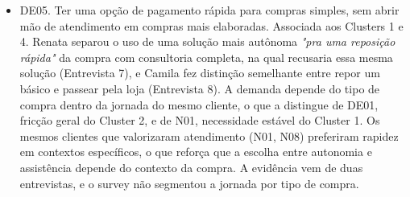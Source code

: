 \begin{itemize}
    \item DE05. Ter uma opção de pagamento rápida para compras simples, sem abrir mão de atendimento em compras mais elaboradas. Associada aos Clusters 1 e 4. Renata separou o uso de uma solução mais autônoma \emph{"pra uma reposição rápida"} da compra com consultoria completa, na qual recusaria essa mesma solução (Entrevista 7), e Camila fez distinção semelhante entre repor um básico e passear pela loja (Entrevista 8). A demanda depende do tipo de compra dentro da jornada do mesmo cliente, o que a distingue de DE01, fricção geral do Cluster 2, e de N01, necessidade estável do Cluster 1. Os mesmos clientes que valorizaram atendimento (N01, N08) preferiram rapidez em contextos específicos, o que reforça que a escolha entre autonomia e assistência depende do contexto da compra. A evidência vem de duas entrevistas, e o survey não segmentou a jornada por tipo de compra.
\end{itemize}

